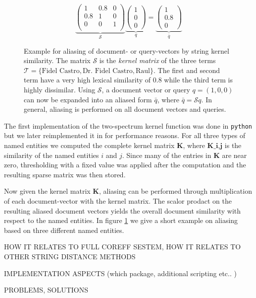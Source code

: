 \begin{figure}[ht]
  \caption{Example for aliasing of document- or query-vectors by string kernel similarity.
The matrix $\mathcal{S}$ is the \textit{kernel matrix} of the three terms $\mathcal{T} = \lbrace
\text{Fidel Castro},\text{Dr. Fidel Castro}, \text{Raul}\rbrace$. The first and second term have a
very high lexical similarity of $0.8$ while the third term is highly dissimilar. Using
$\mathcal{S}$, a document vector or query $q=(1,0,0)$ can now be expanded into an aliased form
$\bar q$, where $\bar q = \mathcal{S}q$. In general, aliasing is performed on all document vectors
and queries.}
  \[
     \underbrace{\begin{pmatrix}
      1   & 0.8 & 0\\
      0.8 & 1   & 0\\
      0   & 0   & 1\\
     \end{pmatrix}}_{\mathcal{S}}
     \underbrace{\begin{pmatrix}
     1\\ 0\\0 
     \end{pmatrix}}_{q}
     =
     \underbrace{\begin{pmatrix}
     1\\ 0.8\\0 
     \end{pmatrix}}_{\bar q}
  \]
  \label{eq:example_string_sim}
\end{figure}


The first implementation of the two-spectrum kernel function was done in \texttt{python} but we  later reimplemented it in  for performance reasons. For all three types of named entities we computed the complete kernel matrix $\textbf{K}$, where $\textbf{K_{i,j}}$ is the similarity of the named entities $i$ and $j$. Since many of the entries in $\textbf{K}$ are near zero, thresholding with a fixed value was applied after the computation and the resulting sparse matrix was then stored.

Now given the kernel matrix $\textbf{K}$, aliasing can be performed through multiplication of each document-vector with the kernel matrix. The scalor prodact on the resulting aliased document vectors yields the overall document similarity with respect to the named entities. In figure \ref{eq:example_string_sim} we give a short example on aliasing based on three different named entities.





HOW IT RELATES TO FULL COREFF SESTEM, HOW IT RELATES TO OTHER STRING DISTANCE METHODS

IMPLEMENTATION ASPECTS (which package, additional scripting etc.. )

PROBLEMS, SOLUTIONS



